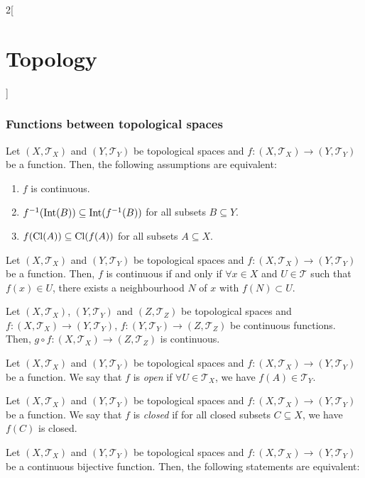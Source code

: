 \documentclass[../../../main.tex]{subfiles}
\begin{document}
\begin{multicols}{2}[\section{Topology}]
  \subsubsection{Functions between topological spaces}
  \begin{theorem}
    Let $(X,\mathcal{T}_X)$ and $(Y,\mathcal{T}_Y)$ be topological spaces and $f:(X,\mathcal{T}_X)\rightarrow (Y,\mathcal{T}_Y)$ be a function. Then, the following assumptions are equivalent:
    \begin{enumerate}
      \item $f$ is continuous.
      \item $f^{-1}(\operatorname{Int}(B))\subseteq \operatorname{Int}(f^{-1}(B))$ for all subsets $B\subseteq Y$.
      \item $f(\operatorname{Cl}(A))\subseteq \operatorname{Cl}(f(A))$ for all subsets $A\subseteq X$.
    \end{enumerate}
  \end{theorem}
  \begin{theorem}
    Let $(X,\mathcal{T}_X)$ and $(Y,\mathcal{T}_Y)$ be topological spaces and $f:(X,\mathcal{T}_X)\rightarrow (Y,\mathcal{T}_Y)$ be a function. Then, $f$ is continuous if and only if $\forall x\in X$ and $U\in\mathcal{T}$ such that $f(x)\in U$, there exists a neighbourhood $N$ of $x$ with $f(N)\subset U$.
  \end{theorem}
  \begin{prop}
    Let $(X,\mathcal{T}_X)$, $(Y,\mathcal{T}_Y)$ and $(Z,\mathcal{T}_Z)$ be topological spaces and $f:(X,\mathcal{T}_X)\rightarrow (Y,\mathcal{T}_Y)$, $f:(Y,\mathcal{T}_Y)\rightarrow (Z,\mathcal{T}_Z)$ be continuous functions. Then, $g\circ f:(X,\mathcal{T}_X)\rightarrow (Z,\mathcal{T}_Z)$ is continuous.
  \end{prop}
  \begin{definition}
    Let $(X,\mathcal{T}_X)$ and $(Y,\mathcal{T}_Y)$ be topological spaces and $f:(X,\mathcal{T}_X)\rightarrow (Y,\mathcal{T}_Y)$ be a function. We say that $f$ is \textit{open} if $\forall U\in\mathcal{T}_X$, we have $f(A)\in \mathcal{T}_Y$.
  \end{definition}
  \begin{definition}
    Let $(X,\mathcal{T}_X)$ and $(Y,\mathcal{T}_Y)$ be topological spaces and $f:(X,\mathcal{T}_X)\rightarrow (Y,\mathcal{T}_Y)$ be a function. We say that $f$ is \textit{closed} if for all closed subsets $C\subseteq X$, we have $f(C)$ is closed.
  \end{definition}
  \begin{prop}
    Let $(X,\mathcal{T}_X)$ and $(Y,\mathcal{T}_Y)$ be topological spaces and $f:(X,\mathcal{T}_X)\rightarrow (Y,\mathcal{T}_Y)$ be a continuous bijective function. Then, the following statements are equivalent:

\end{prop}
\end{multicols}
\end{document}
